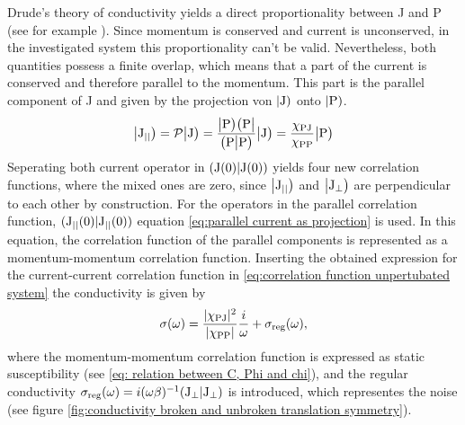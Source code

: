 Drude's theory of conductivity yields a direct proportionality between J and P (see for example \cite{Gross&Marx}).
Since momentum is conserved and current is unconserved, in the investigated system this proportionality can't be valid.
Nevertheless, both quantities possess a finite overlap, which means that a part of the current is conserved and therefore parallel to the momentum.
This part is the parallel component of J and given by the projection von $|\mathrm{\mathrm{J}})$ onto $|\mathrm{\mathrm{P}})$.
%
\begin{align}
	\big|{\mathrm{J}_{\mid\mid}}\big) = \mathcal{P}\big|{\mathrm{J}}\big) = \frac{\big|{\mathrm{P}}\big)\big({\mathrm{P}}\big|}{\big({\mathrm{P}}\big|{\mathrm{P}}\big)} \big|{\mathrm{J}}\big) = \frac{\chi_{\mathrm{PJ}}}{\chi_{\mathrm{PP}}} \big|{\mathrm{P}}\big)
	\label{eq:parallel current as projection}
\end{align}
%
Seperating both current operator in $({\mathrm{J}(0)}|{\mathrm{J}(0)})$ yields four new correlation functions, where the mixed ones are zero, since $\big|{\mathrm{J}_{\mid\mid}}\big)$ and $\big|{\mathrm{J}_{\bot}}\big)$ are perpendicular to each other by construction.
For the operators in the parallel correlation function, $({\mathrm{J}_{\mid\mid}(0)}|{\mathrm{J}_{\mid\mid}(0)})$ equation \eqref{eq:parallel current as projection} is used.
In this equation, the correlation function of the parallel components is represented as a momentum-momentum correlation function.
Inserting the obtained expression for the current-current correlation function in \eqref{eq:correlation function unpertubated system} the conductivity is given by 
%
\begin{align}
	\sigma (\omega) = \frac{\vert\chi_{\mathrm{PJ}}\vert^{2}}{\vert\chi_{\mathrm{PP}}\vert} \frac{i}{\omega}  + \sigma_{\mathrm{reg}}(\omega),
\end{align}
%
where the momentum-momentum correlation function is expressed as static susceptibility (see \eqref{eq: relation between C, Phi and chi}), and the regular conductivity $\sigma_{\mathrm{reg}}(\omega) = i(\omega \beta)^{-1} ({\mathrm{J}_{\bot}}|{\mathrm{J}_{\bot}})$ is introduced, which representes the noise (see figure \ref{fig:conductivity broken and unbroken translation symmetry}).

